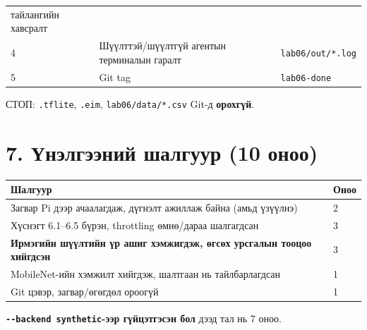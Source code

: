 \begin{longtable}[]{@{}lll@{}}
\begin{minipage}[t]{0.30\columnwidth}
тайлангийн хавсралт\strut
\end{minipage}\tabularnewline
\begin{minipage}[t]{0.30\columnwidth}\raggedright
4\strut
\end{minipage} & \begin{minipage}[t]{0.30\columnwidth}\raggedright
Шүүлттэй/шүүлтгүй агентын терминалын гаралт\strut
\end{minipage} & \begin{minipage}[t]{0.30\columnwidth}\raggedright
\texttt{lab06/out/*.log}\strut
\end{minipage}\tabularnewline
\begin{minipage}[t]{0.30\columnwidth}\raggedright
5\strut
\end{minipage} & \begin{minipage}[t]{0.30\columnwidth}\raggedright
Git tag\strut
\end{minipage} & \begin{minipage}[t]{0.30\columnwidth}\raggedright
\texttt{lab06-done}\strut
\end{minipage}\tabularnewline
\bottomrule
\end{longtable}\endgroup

СТОП: \texttt{.tflite}, \texttt{.eim}, \texttt{lab06/data/*.csv} Git-д \textbf{орохгүй}.

\hypertarget{ux4afux43dux44dux43bux433ux44dux44dux43dux438ux439-ux448ux430ux43bux433ux443ux443ux440-10-ux43eux43dux43eux43e}{%
\section{7. Үнэлгээний шалгуур (10 оноо)}\label{ux4afux43dux44dux43bux433ux44dux44dux43dux438ux439-ux448ux430ux43bux433ux443ux443ux440-10-ux43eux43dux43eux43e}}

\begingroup\scriptsize\begin{longtable}[]{@{}ll@{}}
\toprule
Шалгуур & Оноо\tabularnewline
\midrule
\endhead
Загвар Pi дээр ачаалагдаж, дүгнэлт ажиллаж байна (амьд үзүүлнэ) & 2\tabularnewline
Хүснэгт 6.1--6.5 бүрэн, throttling өмнө/дараа шалгагдсан & 3\tabularnewline
\textbf{Ирмэгийн шүүлтийн үр ашиг хэмжигдэж, өгсөх урсгалын тооцоо хийгдсэн} & 3\tabularnewline
MobileNet-ийн хэмжилт хийгдэж, шалтгаан нь тайлбарлагдсан & 1\tabularnewline
Git цэвэр, загвар/өгөгдөл ороогүй & 1\tabularnewline
\bottomrule
\end{longtable}\endgroup

\textbf{\texttt{-\/\allowbreak{}-backend\ synthetic}-ээр гүйцэтгэсэн бол} дээд тал нь 7 оноо.


